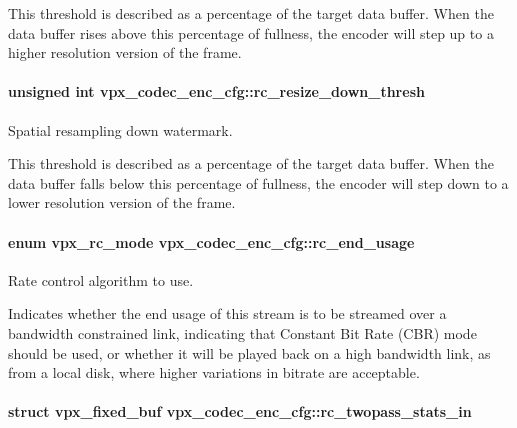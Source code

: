 This threshold is described as a percentage of the target data buffer. When the data buffer rises above this percentage of fullness, the encoder will step up to a higher resolution version of the frame. \hypertarget{structvpx__codec__enc__cfg_a1be7bd7b0eaf1e99b5e4028c37c65488}{
\paragraph[{rc\-\_\-resize\-\_\-down\-\_\-thresh}]{\setlength{\rightskip}{0pt plus 5cm}unsigned int vpx\-\_\-codec\-\_\-enc\-\_\-cfg\-::rc\-\_\-resize\-\_\-down\-\_\-thresh}}\label{structvpx__codec__enc__cfg_a1be7bd7b0eaf1e99b5e4028c37c65488}


Spatial resampling down watermark. 

This threshold is described as a percentage of the target data buffer. When the data buffer falls below this percentage of fullness, the encoder will step down to a lower resolution version of the frame. \hypertarget{structvpx__codec__enc__cfg_a99c415edb6c6f909a095a57c3430a116}{
\paragraph[{rc\-\_\-end\-\_\-usage}]{\setlength{\rightskip}{0pt plus 5cm}enum {\bf vpx\-\_\-rc\-\_\-mode} vpx\-\_\-codec\-\_\-enc\-\_\-cfg\-::rc\-\_\-end\-\_\-usage}}\label{structvpx__codec__enc__cfg_a99c415edb6c6f909a095a57c3430a116}


Rate control algorithm to use. 

Indicates whether the end usage of this stream is to be streamed over a bandwidth constrained link, indicating that Constant Bit Rate (C\-B\-R) mode should be used, or whether it will be played back on a high bandwidth link, as from a local disk, where higher variations in bitrate are acceptable. \hypertarget{structvpx__codec__enc__cfg_a618616a07d9d8883c544731957b56f3c}{
\paragraph[{rc\-\_\-twopass\-\_\-stats\-\_\-in}]{\setlength{\rightskip}{0pt plus 5cm}struct {\bf vpx\-\_\-fixed\-\_\-buf} vpx\-\_\-codec\-\_\-enc\-\_\-cfg\-::rc\-\_\-twopass\-\_\-stats\-\_\-in}}\label{structvpx__codec__enc__cfg_a618616a07d9d8883c544731957b56f3c}



